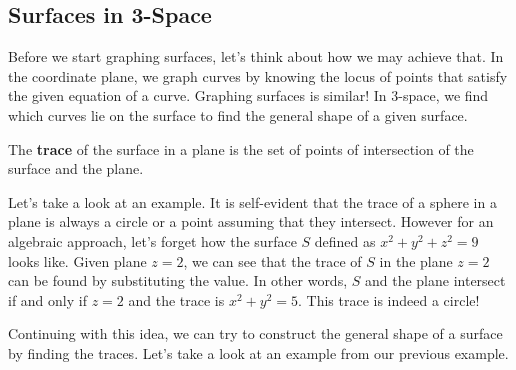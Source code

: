 \documentclass[../../main.tex]{subfiles}
\begin{document}
\subsection{Surfaces in 3-Space}

Before we start graphing surfaces, let's think about how we may
achieve that. In the coordinate plane, we graph curves by knowing
the locus of points that satisfy the given equation of a curve.
Graphing surfaces is similar! In 3-space, we find which curves
lie on the surface to find the general shape of a given surface.

\begin{definition}{}{}
The \textbf{trace} of the surface in a plane is the set of points
of intersection of the surface and the plane.
\end{definition}

Let's take a look at an example. It is self-evident that the trace
of a sphere in a plane is always a circle or a point assuming that
they intersect. However for an algebraic approach, let's forget
how the surface $S$ defined as $x^2 + y^2 + z^2 = 9$ looks like.
Given plane $z = 2$, we can see that the trace of $S$ in the plane
$z = 2$ can be found by substituting the value. In other words,
$S$ and the plane intersect if and only if $z = 2$ and the trace
is $x^2 + y^2 = 5$. This trace is indeed a circle!

\begin{figure}[H]
\centering
{}
\end{figure}

Continuing with this idea, we can try to construct the general
shape of a surface by finding the traces. Let's take a look at
an example from our previous example.
\end{document}

